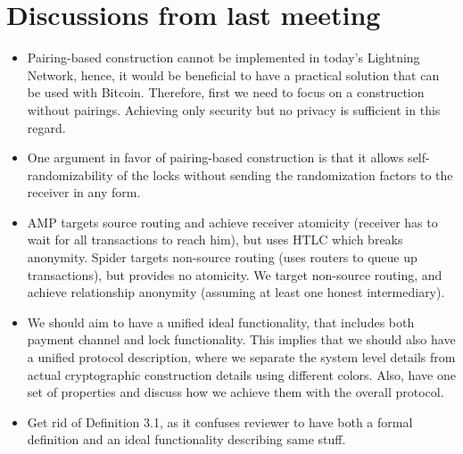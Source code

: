 \section{Discussions from last meeting}

\begin{itemize}
	\item Pairing-based construction cannot be implemented in today's Lightning Network, hence, it would be beneficial to have a practical solution that can be used with Bitcoin. Therefore, first we need to focus on a construction without pairings. Achieving only security but no privacy is sufficient in this regard.
	\item One argument in favor of pairing-based construction is that it allows self-randomizability of the locks without sending the randomization factors to the receiver in any form.
	\item AMP targets source routing and achieve receiver atomicity (receiver has to wait for all transactions to reach him), but uses HTLC which breaks anonymity. Spider targets non-source routing (uses routers to queue up transactions), but provides no atomicity. We target non-source routing, and achieve relationship anonymity (assuming at least one honest intermediary).
	\item We should aim to have a unified ideal functionality, that includes both payment channel  and lock functionality. This implies that we should also have a unified protocol description, where we separate the system level details from actual cryptographic construction details using different colors. Also, have one set of properties and discuss how we achieve them with the overall protocol.
	\item Get rid of Definition 3.1, as it confuses reviewer to have both a formal definition and an ideal functionality describing same stuff.
\end{itemize}
